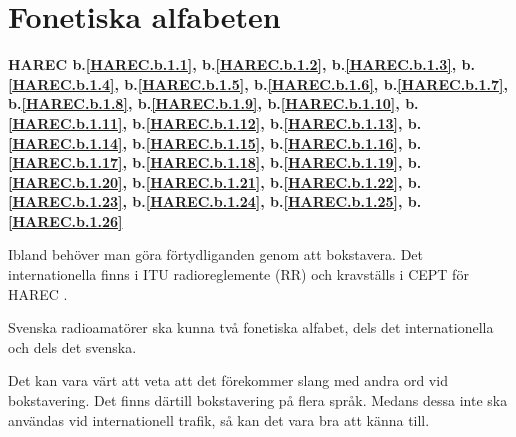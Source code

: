 \section{Fonetiska alfabeten}
\textbf{
HAREC b.\ref{HAREC.b.1.1}\label{myHAREC.b.1.1},
 b.\ref{HAREC.b.1.2}\label{myHAREC.b.1.2},
 b.\ref{HAREC.b.1.3}\label{myHAREC.b.1.3},
 b.\ref{HAREC.b.1.4}\label{myHAREC.b.1.4},
 b.\ref{HAREC.b.1.5}\label{myHAREC.b.1.5},
 b.\ref{HAREC.b.1.6}\label{myHAREC.b.1.6},
 b.\ref{HAREC.b.1.7}\label{myHAREC.b.1.7},
 b.\ref{HAREC.b.1.8}\label{myHAREC.b.1.8},
 b.\ref{HAREC.b.1.9}\label{myHAREC.b.1.9},
 b.\ref{HAREC.b.1.10}\label{myHAREC.b.1.10},
 b.\ref{HAREC.b.1.11}\label{myHAREC.b.1.11},
 b.\ref{HAREC.b.1.12}\label{myHAREC.b.1.12},
 b.\ref{HAREC.b.1.13}\label{myHAREC.b.1.13},
 b.\ref{HAREC.b.1.14}\label{myHAREC.b.1.14},
 b.\ref{HAREC.b.1.15}\label{myHAREC.b.1.15},
 b.\ref{HAREC.b.1.16}\label{myHAREC.b.1.16},
 b.\ref{HAREC.b.1.17}\label{myHAREC.b.1.17},
 b.\ref{HAREC.b.1.18}\label{myHAREC.b.1.18},
 b.\ref{HAREC.b.1.19}\label{myHAREC.b.1.19},
 b.\ref{HAREC.b.1.20}\label{myHAREC.b.1.20},
 b.\ref{HAREC.b.1.21}\label{myHAREC.b.1.21},
 b.\ref{HAREC.b.1.22}\label{myHAREC.b.1.22},
 b.\ref{HAREC.b.1.23}\label{myHAREC.b.1.23},
 b.\ref{HAREC.b.1.24}\label{myHAREC.b.1.24},
 b.\ref{HAREC.b.1.25}\label{myHAREC.b.1.25},
 b.\ref{HAREC.b.1.26}\label{myHAREC.b.1.26}
}

Ibland behöver man göra förtydliganden genom att bokstavera.
Det internationella finns i ITU radioreglemente (RR) \cite[Appendix 14]{ITU-RR}
och kravställs i CEPT för HAREC \cite[Annex 6]{TR6102}.

Svenska radioamatörer ska kunna två fonetiska alfabet, dels det
internationella och dels det svenska.

Det kan vara värt att veta att det förekommer slang med andra ord vid
bokstavering. Det finns därtill bokstavering på flera språk. Medans
dessa inte ska användas vid internationell trafik, så kan det vara bra
att känna till.

